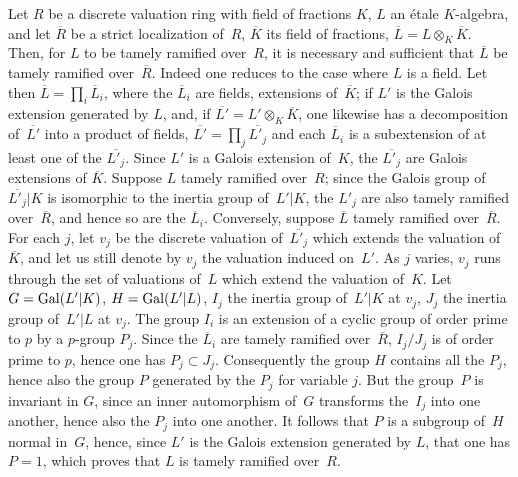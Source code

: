 \subsubsection{}
\label{XIII.2.0.2}
Let $R$ be a discrete valuation ring with field of fractions
$K$, $L$ an étale $K$-algebra, and let $\overline{R}$ be a
strict localization of~$R$, $\overline{K}$ its field of fractions,
$\overline{L} = L \otimes_K \overline{K}$. Then, for $L$ to be
tamely ramified over~$R$, it is necessary and sufficient that
$\overline{L}$ be tamely ramified over~$\overline{R}$. Indeed one reduces to the case where $L$ is a
field. Let then $\overline{L} = \prod_i \overline{L}_i$, where
the $\overline{L}_i$ are fields, extensions of~$\overline{K}$; if
$L'$ is the Galois extension generated by $L$, and, if
$\overline{L'} = L' \otimes_K \overline{K}$,
one likewise has a decomposition of~$\overline{L'}$ into a product
of fields,
$\overline{L'} = \prod_j \overline{L'_j}$
and each $\overline{L}_i$ is a subextension of at least one of the
$\overline{L'_j}$. Since $L'$ is a Galois extension of~$K$,
the $\overline{L'_j}$ are Galois extensions of
$\overline{K}$. Suppose $L$ tamely ramified over~$R$;
since the Galois group of~$\overline{L'_j}|K$ is isomorphic to the
inertia group of~$L'|K$, the $L'_j$ are also tamely
ramified over~$\overline{R}$, and hence so are the
$\overline{L}_i$. Conversely, suppose $\overline{L}$
tamely ramified over~$\overline{R}$. For each $j$,
let $v_j$ be the discrete valuation of~$\overline{L'_j}$ which extends
the valuation of~$\overline{K}$, and let us still denote by $v_j$ the valuation
induced on~$L'$. As $j$ varies, $v_j$ runs through the set of
valuations of~$L$ which extend the valuation of~$K$. Let $G =
\operatorname{Gal}(L'|K)$, $H=\operatorname{Gal}(L'|L)$, $I_j$ the inertia group of~$L'|K$ at
$v_j$, $J_j$ the inertia group of~$L'|L$ at $v_j$. The group $I_i$
is an extension of a cyclic group of order prime to $p$ by a
$p$-group $P_j$. Since the $\overline{L}_i$ are tamely
ramified over~$\overline{R}$, $I_j/J_j$ is of order prime to
$p$, hence one has $P_j \subset J_j$. Consequently the group $H$ contains
all the $P_j$, hence also the group $P$ generated by
the $P_j$ for variable $j$. But the group~$P$ is invariant in $G$,
since an inner automorphism of~$G$ transforms the~$I_j$ into one
another, hence also the $P_j$ into one another. It follows that $P$ is a
subgroup of~$H$ normal in~$G$, hence, since $L'$ is
the Galois extension generated by $L$, that one has $P=1$, which
proves that $L$ is tamely ramified over~$R$.

